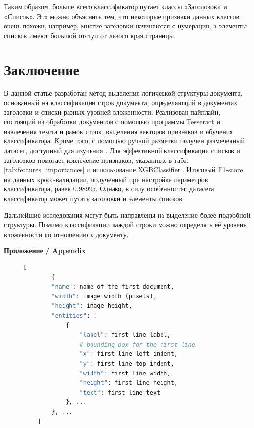 \documentclass{ProcISPRAS}
\begin{document}
Таким образом, больше всего классификатор путает классы «Заголовок» и «Список». Это можно объяснить тем, что некоторые признаки данных классов очень похожи, например, многие заголовки начинаются с нумерации, а элементы списков имеют большой отступ от левого края страницы.

\section{Заключение}
В данной статье разработан метод выделения логической структуры документа, основанный на классификации строк документа, определяющий в документах заголовки и списки разных уровней вложенности.
Реализован пайплайн, состоящий из обработки документов с помощью программы Tesseract \cite{tesseract} и извлечения текста и рамок строк, выделения векторов признаков и обучения классификатора. Кроме того, с помощью ручной разметки получен размеченный датасет, доступный для изучения \cite{data}. Для эффективной классификации списков и заголовков помогает извлечение признаков, указанных в табл. \ref{tab:features_importances} и использование XGBClassifier \cite{xgb}. Итоговый F1-score на данных кросс-валидации, полученный при настройке параметров классификатора, равен 0.98995. Однако, в силу особенностей датасета классификатор может путать заголовки и элементы списков.

Дальнейшие исследования могут быть направлены на выделение более подробной структуры. Помимо классификации каждой строки можно определять её уровень вложенности по отношению к документу.

\printbibliography

{\vskip 12pt\normalfont\sffamily\bfseries\large Приложение / Appendix}
\setlength{\parskip}{6pt}

\begin{figure}[ht]
    \centering
    \begin{lstlisting}[language=Python,frame=none,basicstyle=\ttfamily]
    [
        {
        "name": name of the first document,
        "width": image width (pixels),
        "height": image height,
        "entities": [
            {
                "label": first line label,
                # bounding box for the first line
                "x": first line left indent,
                "y": first line top indent,
                "width": first line width,
                "height": first line height,
                "text": first line text
            }, ...
        }, ...
    ]
    \end{lstlisting}
    \label{fig:label}
\end{figure}
\end{document}
